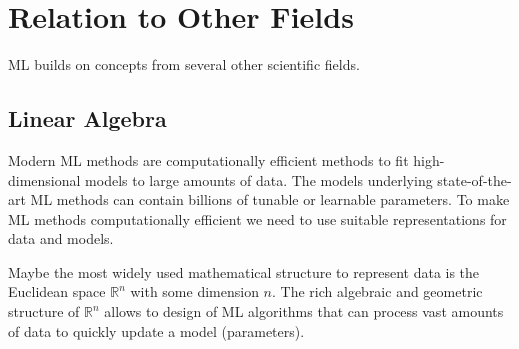 \documentclass[12pt]{report}
\begin{document}
%
%
%
%
%
%


\section{Relation to Other Fields}

ML builds on concepts from several other scientific fields. 

\subsection{Linear Algebra} 

Modern ML methods are computationally efficient methods to fit 
high-dimensional models to large amounts of data. The models 
underlying state-of-the-art ML methods can contain billions of 
tunable or learnable parameters. To make ML methods computationally 
efficient we need to use suitable representations for data and models. 

Maybe the most widely used mathematical structure to represent 
data is the Euclidean space $\mathbb{R}^{n}$ with some dimension 
$n$. The rich algebraic and geometric structure of $\mathbb{R}^{n}$ 
allows to design of ML algorithms that can process vast amounts 
of data to quickly update a model (parameters). 
\end{document}
